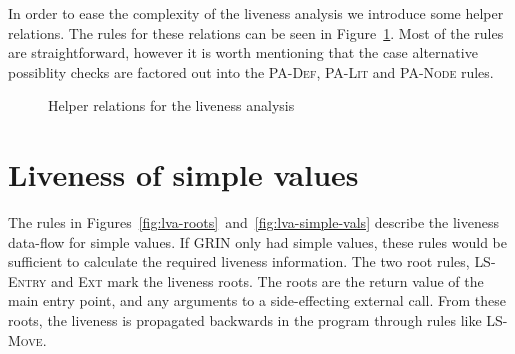 \documentclass[main.tex]{subfiles}
\begin{document}
	In order to ease the complexity of the liveness analysis we introduce some helper relations. The rules for these relations can be seen in Figure~\ref{fig:lva-helpers}. Most of the rules are straightforward, however it is worth mentioning that the case alternative possiblity checks are factored out into the \textsc{PA-Def}, \textsc{PA-Lit} and \textsc{PA-Node} rules.

  \begin{figure}[h]

  \caption{Helper relations for the liveness analysis}
  \label{fig:lva-helpers}
  \end{figure}

	\section{Liveness of simple values}
	
	The rules in Figures~\ref{fig:lva-roots}~and~\ref{fig:lva-simple-vals} describe the liveness data-flow for simple values. If GRIN only had simple values, these rules would be sufficient to calculate the required liveness information. The two root rules, \textsc{LS-Entry} and \textsc{Ext} mark the liveness roots. The roots are the return value of the main entry point, and any arguments to a side-effecting external call. From these roots, the liveness is propagated backwards in the program through rules like \textsc{LS-Move}.
\end{document}
